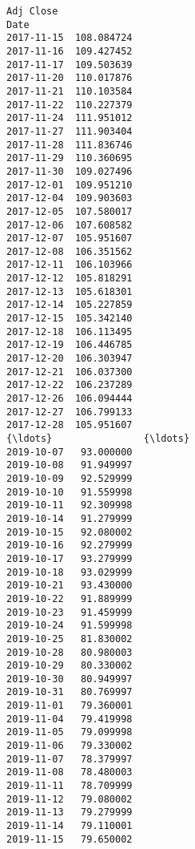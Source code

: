 \documentclass[11pt]{article}
\begin{document}
\begin{Verbatim}[commandchars=\\\{\}]
             Adj Close  
Date                    
2017-11-15  108.084724  
2017-11-16  109.427452  
2017-11-17  109.503639  
2017-11-20  110.017876  
2017-11-21  110.103584  
2017-11-22  110.227379  
2017-11-24  111.951012  
2017-11-27  111.903404  
2017-11-28  111.836746  
2017-11-29  110.360695  
2017-11-30  109.027496  
2017-12-01  109.951210  
2017-12-04  109.903603  
2017-12-05  107.580017  
2017-12-06  107.608582  
2017-12-07  105.951607  
2017-12-08  106.351562  
2017-12-11  106.103966  
2017-12-12  105.818291  
2017-12-13  105.618301  
2017-12-14  105.227859  
2017-12-15  105.342140  
2017-12-18  106.113495  
2017-12-19  106.446785  
2017-12-20  106.303947  
2017-12-21  106.037300  
2017-12-22  106.237289  
2017-12-26  106.094444  
2017-12-27  106.799133  
2017-12-28  105.951607  
{\ldots}                {\ldots}  
2019-10-07   93.000000  
2019-10-08   91.949997  
2019-10-09   92.529999  
2019-10-10   91.559998  
2019-10-11   92.309998  
2019-10-14   91.279999  
2019-10-15   92.080002  
2019-10-16   92.279999  
2019-10-17   93.279999  
2019-10-18   93.029999  
2019-10-21   93.430000  
2019-10-22   91.889999  
2019-10-23   91.459999  
2019-10-24   91.599998  
2019-10-25   81.830002  
2019-10-28   80.980003  
2019-10-29   80.330002  
2019-10-30   80.949997  
2019-10-31   80.769997  
2019-11-01   79.360001  
2019-11-04   79.419998  
2019-11-05   79.099998  
2019-11-06   79.330002  
2019-11-07   78.379997  
2019-11-08   78.480003  
2019-11-11   78.709999  
2019-11-12   79.080002  
2019-11-13   79.279999  
2019-11-14   79.110001  
2019-11-15   79.650002  


\end{Verbatim}
\end{document}
